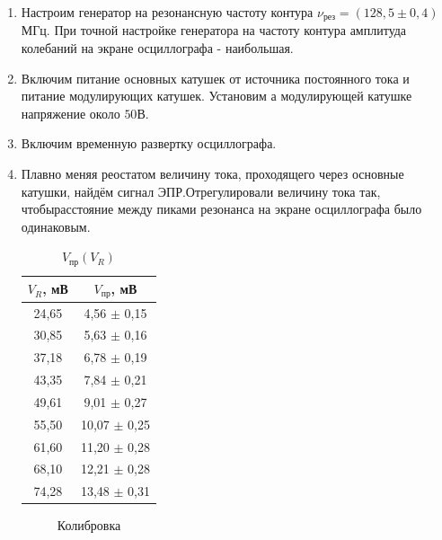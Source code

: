 \documentclass[a4paper]{article}
\begin{document}
\begin{enumerate}
    \item Настроим генератор на резонансную частоту контура $\nu_{рез} = (128,5 \pm 0,4)$МГц. При точной настройке генератора на частоту контура амплитуда колебаний на экране осциллографа - наибольшая. 
    \item Включим питание основных катушек от источника постоянного тока и питание модулирующих катушек. Установим а модулирующей катушке напряжение около $50В$.
    \item Включим временную развертку осциллографа.
    \item Плавно меняя реостатом величину тока, проходящего через основные катушки, найдём сигнал ЭПР.Отрегулировали величину тока так, чтобырасстояние между пиками резонанса на экране осциллографа было одинаковым.
    
    \begin{table}[H]
        \begin{center}
            \begin{tabular}{|c|c|}
                \hline
                $V_R$, мВ & $V_{пр}$, мВ \\  \hline
                24,65    & 4,56 $\pm$ 0,15\\ \hline
                30,85    & 5,63 $\pm$ 0,16\\ \hline
                37,18    & 6,78 $\pm$ 0,19\\ \hline
                43,35    & 7,84 $\pm$ 0,21\\ \hline
                49,61    & 9,01 $\pm$ 0,27\\ \hline
                55,50    & 10,07 $\pm$ 0,25\\ \hline
                61,60    & 11,20 $\pm$ 0,28\\ \hline
                68,10    & 12,21 $\pm$ 0,28\\ \hline
                74,28    & 13,48 $\pm$ 0,31 \\ \hline
                \end{tabular}
                \caption{$V_{пр}(V_R)$}
        \end{center}
    \end{table}
   
    \begin{figure}[H]
    \caption{Колибровка }
    \label{V}
    \end{figure}


\end{enumerate}
\end{document}
